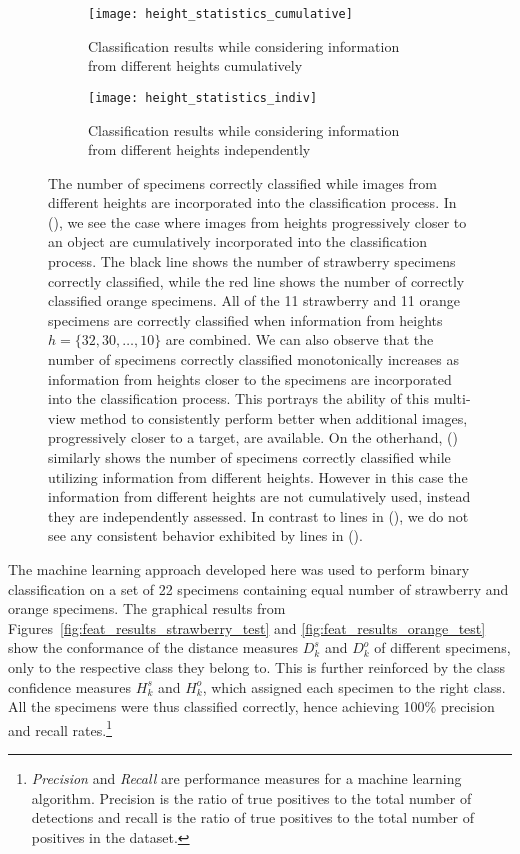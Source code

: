 %
\begin{figure*}
  \centering
  \begin{subfigure}[]{0.7\textwidth}
      \texttt{[image: height\_statistics\_cumulative]}
      \caption{Classification results while considering information from different heights cumulatively}
      \label{fig:height_stat_cumulative}
  \end{subfigure}
  \vskip -2pt
  \begin{subfigure}[]{0.7\textwidth}
      \texttt{[image: height\_statistics\_indiv]}
      \caption{Classification results while considering information from different heights independently}
      \label{fig:height_stat_indiv}
  \end{subfigure}
\caption[Observations on using information from different heights]{The number of specimens correctly classified while images from different heights are incorporated into the classification process. In (), we see the case where images from heights progressively closer to an object are cumulatively incorporated into the classification process. The black line shows the number of strawberry specimens correctly classified, while the red line shows the number of correctly classified orange specimens. All of the 11 strawberry and 11 orange specimens are correctly classified when information from heights $h=\{32,30,\ldots,10\}$ are combined. We can also observe that the number of specimens correctly classified monotonically increases as information from heights closer to the specimens are incorporated into the classification process. This portrays the ability of this multi-view method to consistently perform better when additional images, progressively closer to a target, are 
available. On the otherhand, () similarly shows the number of specimens correctly classified while utilizing information from different heights. However in this case the information from different heights are not cumulatively used, instead they are independently assessed. In contrast to lines in (), we do not see any consistent behavior exhibited by lines in ().}
\label{fig:height_stat}
\end{figure*}	
%

The machine learning approach developed here was used to perform binary classification on a set of 22 specimens containing equal number of strawberry and orange specimens. The graphical results from Figures~\ref{fig:feat_results_strawberry_test} and \ref{fig:feat_results_orange_test} show the conformance of the distance measures $D^s_k$ and $D^o_k$ of different specimens, only to the respective class they belong to. This is further reinforced by the class confidence measures $H^s_k$ and $H^o_k$, which assigned each specimen to the right class. All the specimens were thus classified correctly, hence achieving 100\% precision and recall rates.\footnote{\emph{Precision} and \emph{Recall} are performance measures for a machine learning algorithm. Precision is the ratio of true positives to the total number of detections and recall is the ratio of true positives to the total number of positives in the dataset.} 


